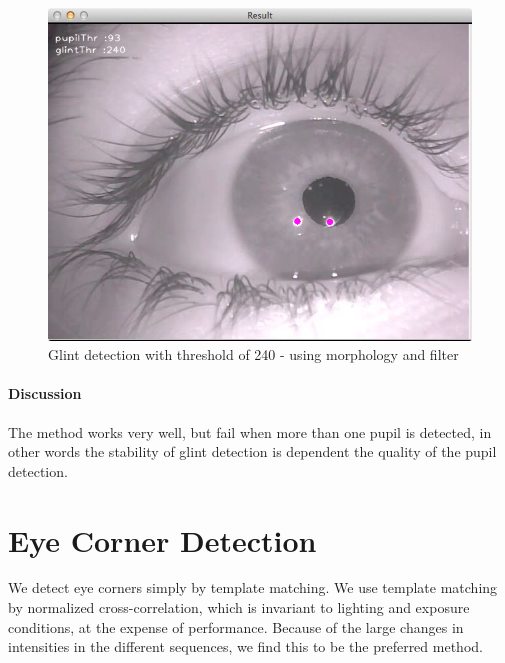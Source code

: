\documentclass[a4paper,11pt]{article}
\begin{document}
\begin{figure}[H]
\centering
\includegraphics[width=.6\linewidth]{glint_filtered}
\caption{Glint detection with threshold of 240 - using morphology and filter}
\label{fig:glint_filtered}
\end{figure}

\paragraph{Discussion} The method works very well, but fail when more than one pupil is detected, in other words the stability of glint detection is dependent the quality of the pupil detection.




\section{Eye Corner Detection}
We detect eye corners simply by template matching. We use template matching by normalized cross-correlation, which is invariant to lighting and exposure conditions, at the expense of performance. Because of the large changes in intensities in the different sequences, we find this to be the preferred method.
\end{document}
